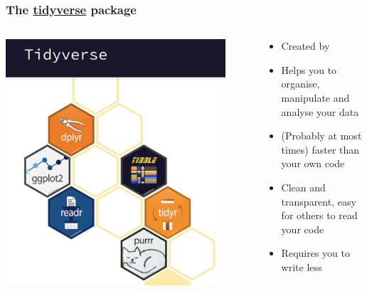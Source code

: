 \documentclass{beamer}
\begin{document}
\begin{frame}
\frametitle{The \href{https://www.tidyverse.org}{tidyverse} package}
\begin{columns}
\begin{center}
\includegraphics[width=0.9\textwidth]{tidy.jpg}
\end{center}
\begin{center}
\begin{itemize}
\item Created by {}
\item Helps you to organise, manipulate and analyse your data
\item (Probably at most times) faster than your own code 
\item Clean and transparent, easy for others to read your code
\item Requires you to write less
\end{itemize}
\end{center}
\end{columns}
\end{frame}
\end{document}
